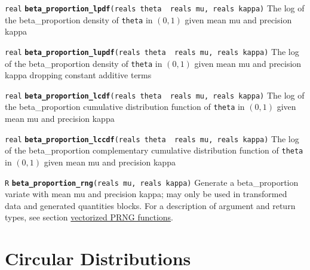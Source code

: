 \documentclass[
  10pt,
]{book}
\begin{document}

\texttt{real} \textbf{\texttt{beta\_proportion\_lpdf}}\texttt{(reals\ theta\ \textbar{}\ reals\ mu,\ reals\ kappa)}\newline
The log of the beta\_proportion density of \texttt{theta} in \((0,1)\) given
mean mu and precision kappa


\texttt{real} \textbf{\texttt{beta\_proportion\_lupdf}}\texttt{(reals\ theta\ \textbar{}\ reals\ mu,\ reals\ kappa)}\newline
The log of the beta\_proportion density of \texttt{theta} in \((0,1)\) given
mean mu and precision kappa dropping constant additive terms


\texttt{real} \textbf{\texttt{beta\_proportion\_lcdf}}\texttt{(reals\ theta\ \textbar{}\ reals\ mu,\ reals\ kappa)}\newline
The log of the beta\_proportion cumulative distribution function of
\texttt{theta} in \((0,1)\) given mean mu and precision kappa


\texttt{real} \textbf{\texttt{beta\_proportion\_lccdf}}\texttt{(reals\ theta\ \textbar{}\ reals\ mu,\ reals\ kappa)}\newline
The log of the beta\_proportion complementary cumulative distribution
function of \texttt{theta} in \((0,1)\) given mean mu and precision kappa


\texttt{R} \textbf{\texttt{beta\_proportion\_rng}}\texttt{(reals\ mu,\ reals\ kappa)}\newline
Generate a beta\_proportion variate with mean mu and precision kappa;
may only be used in transformed data and generated quantities blocks.
For a description of argument and return types, see section
\protect\hyperlink{prng-vectorization}{vectorized PRNG functions}.

\hypertarget{circular-distributions}{%
\chapter{Circular Distributions}\label{circular-distributions}}
\end{document}
